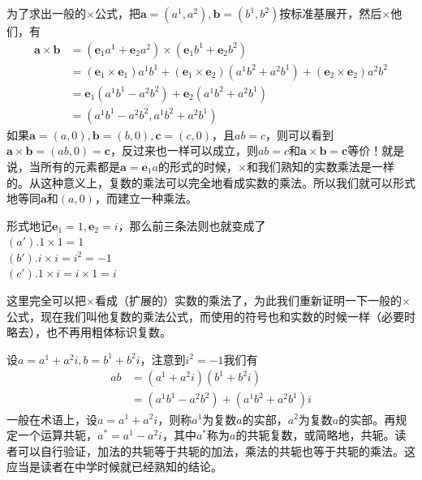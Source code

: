 \documentclass[11pt,a4paper,openany]{book}%
\theoremstyle{plain}%
\begin{document}
\indent 为了求出一般的$\times$公式，把$\bm{a}=(a^1,a^2),\bm{b}=(b^1,b^2)$按标准基展开，然后$\times$他们，有
\begin{equation*}
\begin{split}
\bm{a}\times \bm{b}&=(\bm{e}_{1}a^1+\bm{e}_{2}a^2)\times (\bm{e}_{1}b^1+\bm{e}_{2}b^2)\\
&=(\bm{e}_{1}\times \bm{e}_{1})a^1b^1+(\bm{e}_{1}\times \bm{e}_{2})(a^1b^2+a^2b^1)+(\bm{e}_{2}\times \bm{e}_{2})a^2b^2\\
&=\bm{e}_{1}(a^1b^1-a^2b^2)+\bm{e}_{2}(a^1b^2+a^2b^1)\\
&=(a^1b^1-a^2b^2,a^1b^2+a^2b^1)
\end{split}
\end{equation*}
\indent 如果$\bm{a}=(a,0),\bm{b}=(b,0),\bm{c}=(c,0)$，且$ab=c$，则可以看到$\bm{a}\times \bm{b}=(ab,0)=\bm{c}$，反过来也一样可以成立，则$ab=c$和$\bm{a}\times \bm{b}=\bm{c}$等价！就是说，当所有的元素都是$\bm{a}=\bm{e}_{1}a$的形式的时候，$\times$和我们熟知的实数乘法是一样的。从这种意义上，复数的乘法可以完全地看成实数的乘法。所以我们就可以形式地等同$\bm{a}$和$(a,0)$，而建立一种乘法。

形式地记$\bm{e}_{1}=1,\bm{e}_{2}=i$，那么前三条法则也就变成了\\
$(a')$.$1\times 1=1$\\
$(b')$.$i\times i=i^2=-1$\\
$(c')$.$1\times i=i \times 1=i$

这里完全可以把$\times$看成（扩展的）实数的乘法了，为此我们重新证明一下一般的$\times$公式，现在我们叫他复数的乘法公式，而使用的符号也和实数的时候一样（必要时略去），也不再用粗体标识复数。

设$a=a^1+a^2i,b=b^1+b^2i$，注意到$i^2=-1$我们有
\begin{equation*}
\begin{split}
ab&=(a^1+a^2i)(b^1+b^2i)\\
&=(a^1b^1-a^2b^2)+(a^1b^2+a^2b^1)i
\end{split}
\end{equation*}
一般在术语上，设$a=a^1+a^2i$，则称$a^1$为复数$a$的实部，$a^2$为复数$a$的实部。再规定一个运算共轭，$a^*=a^1-a^2i$，其中$a^*$称为$a$的共轭复数，或简略地，共轭。读者可以自行验证，加法的共轭等于共轭的加法，乘法的共轭也等于共轭的乘法。这应当是读者在中学时候就已经熟知的结论。
\end{document}
